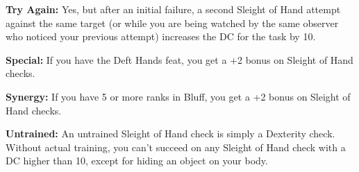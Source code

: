 \textbf{Try Again:} Yes, but after an initial failure, a second Sleight of Hand attempt against the same target (or while you are being watched by the same observer who noticed your previous attempt) increases the DC for the task by 10.

\textbf{Special:} If you have the Deft Hands feat, you get a +2 bonus on Sleight of Hand checks.

\textbf{Synergy:} If you have 5 or more ranks in Bluff, you get a +2 bonus on Sleight of Hand checks.

\textbf{Untrained:} An untrained Sleight of Hand check is simply a Dexterity check. Without actual training, you can’t succeed on any Sleight of Hand check with a DC higher than 10, except for hiding an object on your body.

